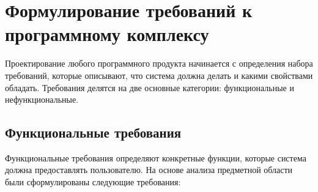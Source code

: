 \section{Формулирование требований к программному комплексу}

Проектирование любого программного продукта начинается с определения набора требований, которые описывают, что система должна делать и какими свойствами обладать. Требования делятся на две основные категории: функциональные и нефункциональные.

\subsection{Функциональные требования}

Функциональные требования определяют конкретные функции, которые система должна предоставлять пользователю. На основе анализа предметной области были сформулированы следующие требования:

